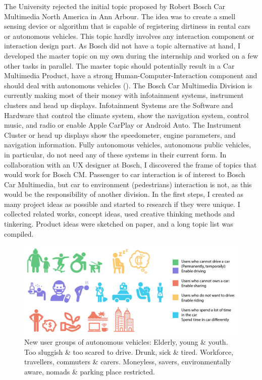 The University rejected the initial topic proposed by Robert Bosch Car Multimedia North America in Ann Arbour. The idea was to create a smell sensing device or algorithm that is capable of registering dirtiness in rental cars or autonomous vehicles. This topic hardly involves any interaction component or interaction design part. As Bosch did not have a topic alternative at hand, I developed the master topic on my own during the internship and worked on a few other tasks in parallel. The master topic should potentially result in a Car Multimedia Product, have a strong Human-Computer-Interaction component and should deal with autonomous vehicles (\emph{}). The Bosch Car Multimedia Division is currently making most of their money with infotainment systems, instrument clusters and head up displays. Infotainment Systems are the Software and Hardware that control the climate system, show the navigation system, control music, and radio or enable Apple CarPlay or Android Auto. The Instrument Cluster or head up displays show the speedometer, engine parameters, and navigation information. Fully autonomous vehicles, autonomous public vehicles, in particular, do not need any of these systems in their current form. In collaboration with an UX designer at Bosch, I discovered the frame of topics that would work for Bosch CM. Passenger to car interaction is of interest to Bosch Car Multimedia, but car to environment (pedestrians) interaction is not, as this would be the responsibility of another division. In the first steps, I created as many project ideas as possible and started to research if they were unique. I collected related works, concept ideas, used creative thinking methods and tinkering. Product ideas were sketched on paper, and a long topic list was compiled. 
\begin{figure}
    \includegraphics[width=1\textwidth]{fig/users.png}
    \caption[Users]{New user groups of autonomous vehicles: Elderly, young \& youth. Too sluggish \& too scared to drive. Drunk, sick \& tired. Workforce, travellers, commuters \& carers. Moneyless, savers, environmentally aware, nomads \& parking place restricted.}
    \label{fig:users}
\end{figure}

